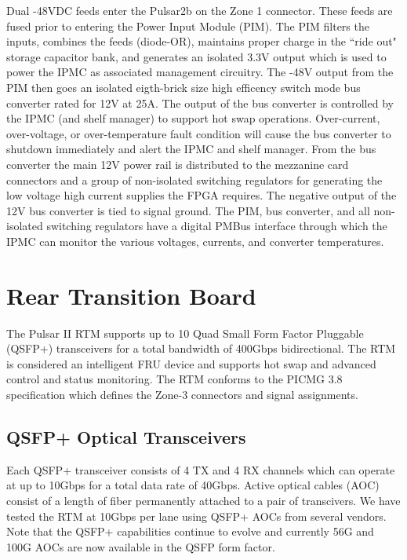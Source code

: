 \documentclass[letterpaper]{article}
\begin{document}
Dual -48VDC feeds enter the Pulsar2b on the Zone 1 connector.  These feeds are fused prior to entering the Power Input Module (PIM).  The PIM filters the inputs, combines the feeds (diode-OR), maintains proper charge in the ``ride out" storage capacitor bank, and generates an isolated 3.3V output which is used to power the IPMC as associated management circuitry.  The -48V output from the PIM then goes an isolated eigth-brick size high efficency switch mode bus converter rated for 12V at 25A.  The output of the bus converter is controlled by the IPMC (and shelf manager) to support hot swap operations.  Over-current, over-voltage, or over-temperature fault condition will cause the bus converter to shutdown immediately and alert the IPMC and shelf manager.  From the bus converter the main 12V power rail is distributed to the mezzanine card connectors and a group of non-isolated switching regulators for generating the low voltage high current supplies the FPGA requires.  The negative output of the 12V bus converter is tied to signal ground.  The PIM, bus converter, and all non-isolated switching regulators have a digital PMBus interface through which the IPMC can monitor the various voltages, currents, and converter temperatures.


\section{Rear Transition Board}
\label{rtm_section}

The Pulsar II RTM supports up to 10 Quad Small Form Factor Pluggable (QSFP+) transceivers for a total bandwidth of 400Gbps bidirectional.  The RTM is considered an intelligent FRU device and supports hot swap and advanced control and status monitoring.  The RTM conforms to the PICMG 3.8 specification which defines the Zone-3 connectors and signal assignments.

\subsection{QSFP+ Optical Transceivers}

Each QSFP+ transceiver consists of 4 TX and 4 RX channels which can operate at up to 10Gbps for a total data rate of 40Gbps.  Active optical cables (AOC) consist of a length of fiber permanently attached to a pair of transcivers.  We have tested the RTM at 10Gbps per lane using QSFP+ AOCs from several vendors.  Note that the QSFP+ capabilities continue to evolve and currently 56G and 100G AOCs are now available in the QSFP form factor.
\end{document}
